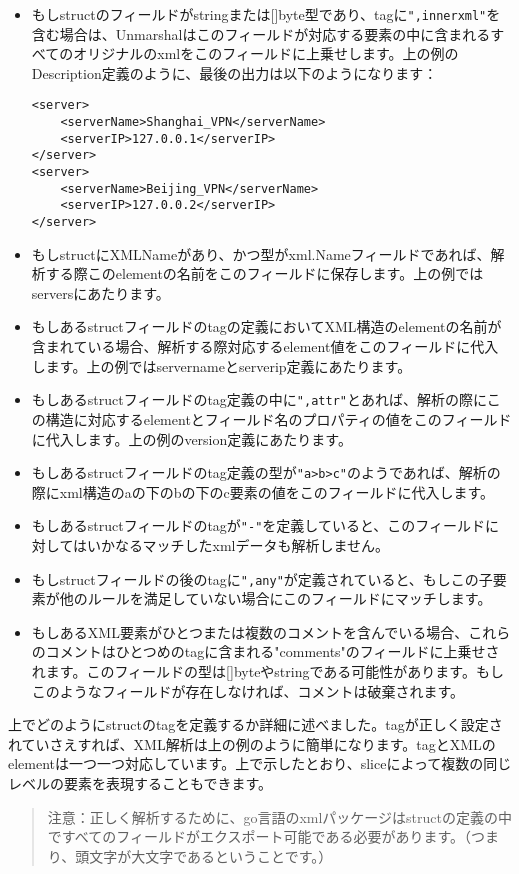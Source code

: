 \begin{itemize}
  \item もしstructのフィールドがstringまたは[]byte型であり、tagに\texttt{",innerxml"}を含む場合は、Unmarshalはこのフィールドが対応する要素の中に含まれるすべてのオリジナルのxmlをこのフィールドに上乗せします。上の例のDescription定義のように、最後の出力は以下のようになります：
    \begin{lstlisting}[numbers=none]
<server>
    <serverName>Shanghai_VPN</serverName>
    <serverIP>127.0.0.1</serverIP>
</server>
<server>
    <serverName>Beijing_VPN</serverName>
    <serverIP>127.0.0.2</serverIP>
</server>
    \end{lstlisting}
  \item もしstructにXMLNameがあり、かつ型がxml.Nameフィールドであれば、解析する際このelementの名前をこのフィールドに保存します。上の例ではserversにあたります。
  \item もしあるstructフィールドのtagの定義においてXML構造のelementの名前が含まれている場合、解析する際対応するelement値をこのフィールドに代入します。上の例ではservernameとserverip定義にあたります。
  \item もしあるstructフィールドのtag定義の中に\texttt{",attr"}とあれば、解析の際にこの構造に対応するelementとフィールド名のプロパティの値をこのフィールドに代入します。上の例のversion定義にあたります。
  \item もしあるstructフィールドのtag定義の型が\texttt{"a>b>c"}のようであれば、解析の際にxml構造のaの下のbの下のc要素の値をこのフィールドに代入します。
  \item もしあるstructフィールドのtagが\texttt{"-"}を定義していると、このフィールドに対してはいかなるマッチしたxmlデータも解析しません。
  \item もしstructフィールドの後のtagに\texttt{",any"}が定義されていると、もしこの子要素が他のルールを満足していない場合にこのフィールドにマッチします。
  \item もしあるXML要素がひとつまたは複数のコメントを含んでいる場合、これらのコメントはひとつめのtagに含まれる"comments"のフィールドに上乗せされます。このフィールドの型は[]byteやstringである可能性があります。もしこのようなフィールドが存在しなければ、コメントは破棄されます。
\end{itemize}

上でどのようにstructのtagを定義するか詳細に述べました。tagが正しく設定されていさえすれば、XML解析は上の例のように簡単になります。tagとXMLのelementは一つ一つ対応しています。上で示したとおり、sliceによって複数の同じレベルの要素を表現することもできます。

\begin{quote}
注意：正しく解析するために、go言語のxmlパッケージはstructの定義の中ですべてのフィールドがエクスポート可能である必要があります。（つまり、頭文字が大文字であるということです。）
\end{quote}

